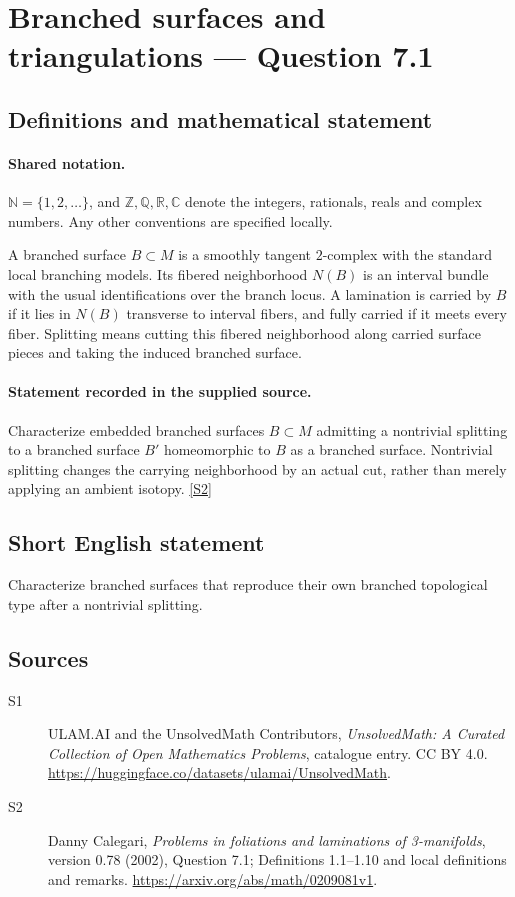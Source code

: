 \documentclass[11pt]{article}
\newcommand{\sref}[2]{\hyperlink{source:#1:#2}{[S#2]}}
\begin{document}
\section{Branched surfaces and triangulations — Question 7.1}\label{statement}

\subsection{Definitions and mathematical statement}

\paragraph{Shared notation.}$\mathbb N=\{1,2,\ldots\}$, and $\mathbb Z,\mathbb Q,\mathbb R,\mathbb C$ denote the integers, rationals, reals and complex numbers. Any other conventions are specified locally.


A branched surface $B\subset M$ is a smoothly tangent $2$-complex with the standard local branching models. Its fibered neighborhood $N(B)$ is an interval bundle with the usual identifications over the branch locus. A lamination is carried by $B$ if it lies in $N(B)$ transverse to interval fibers, and fully carried if it meets every fiber. Splitting means cutting this fibered neighborhood along carried surface pieces and taking the induced branched surface.
\paragraph{Statement recorded in the supplied source.}
Characterize embedded branched surfaces $B\subset M$ admitting a nontrivial splitting to a branched surface $B'$ homeomorphic to $B$ as a branched surface. Nontrivial splitting changes the carrying neighborhood by an actual cut, rather than merely applying an ambient isotopy. \sref{statement}{2}
\subsection{Short English statement}
Characterize branched surfaces that reproduce their own branched topological type after a nontrivial splitting.
\subsection{Sources}
\begin{description}
\item[\hypertarget{source:statement:1}{S1}] ULAM.AI and the UnsolvedMath Contributors, \emph{UnsolvedMath: A Curated Collection of Open Mathematics Problems}, catalogue entry. CC BY 4.0. \url{https://huggingface.co/datasets/ulamai/UnsolvedMath}.
\item[\hypertarget{source:statement:2}{S2}] Danny Calegari, \emph{Problems in foliations and laminations of 3-manifolds}, version 0.78 (2002), Question 7.1; Definitions 1.1--1.10 and local definitions and remarks. \url{https://arxiv.org/abs/math/0209081v1}.
\end{description}
\label{end:statement}
\end{document}
